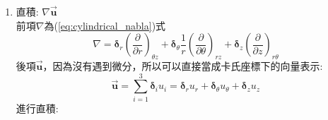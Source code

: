 \documentclass[../main.tex]{subfiles}
\begin{document}
\begin{itemize}
\begin{itemize}
\begin{enumerate}
        只要注意\\
        1.，以紅色標示\\
        2.，以藍色標示\\
        提取出來後，即可按照原本的單位向量運算方式合併
        \begin{equation}
          \resizebox{0.85\textwidth}{!}{%
            $%
            \begin{aligned}
              \nabla \cdot \vec{\bm{u}} &= \left[
                \left(\bm{\delta}_r \cdot \bm{\delta}_r\right) \frac{\partial u_r}{\partial r}
              \right] + \color{red} \left[
                \left(\bm{\delta}_\theta \cdot \bm{\delta}_\theta\right) \frac{u_r}{r} 
              \right] \color{black} + \color{red} \left[
                \cancel{\left(\bm{\delta}_\theta \cdot -\bm{\delta}_r \right)} \frac{u_\theta}{r} 
              \right] \color{black} + \left[
                \left(\bm{\delta}_\theta \cdot \bm{\delta}_\theta\right) \frac{1}{r} \frac{\partial u_\theta}{\partial \theta}
              \right] + \left[
                \left(\bm{\delta}_z \cdot \bm{\delta}_z\right) \frac{\partial u_z}{\partial z}
              \right] \nonumber\\
              &= \boxed{\frac{\partial u_r}{\partial r} + \frac{u_r}{r} + \frac{1}{r} \frac{\partial u_\theta}{\partial \theta} + \frac{\partial u_z}{\partial z}}
            \end{aligned}$
          }
        \end{equation}
        \item 直積: $\nabla\vec{\bm u}$\\
        前項$\nabla$為(\ref{eq:cylindrical_nabla})式
          \begin{equation}
            \nabla = \bm\delta_r \left(\frac{\partial}{\partial r}\right)_{\theta z} +
              \bm\delta_\theta \frac{1}{r}\left(\frac{\partial}{\partial \theta}\right)_{rz} +
              \bm\delta_z \left(\frac{\partial}{\partial z}\right)_{r\theta}
          \end{equation}
          後項$\vec{\bm u}$，因為沒有遇到微分，所以可以直接當成卡氏座標下的向量表示:
          \begin{equation}
            \vec{\bm u} = \sum_{i=1}^3 \bm\delta_i u_i = \bm\delta_r u_r + \bm\delta_\theta u_\theta + \bm\delta_z u_z
          \end{equation}
          進行直積:
          \begin{align}

\end{align}
\end{enumerate}
\end{itemize}
\end{itemize}
\end{document}
